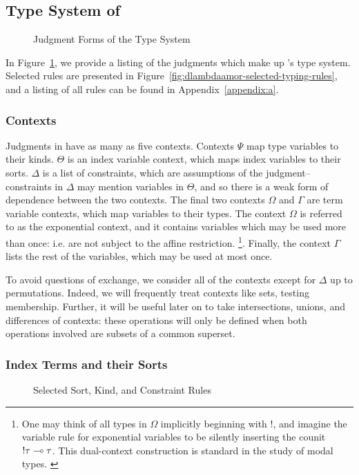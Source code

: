 \subsection{Type System of \dlambdaamor}
\begin{figure}

\label{fig:dlambdaamor-typing-judgments}
\caption{Judgment Forms of the \dlambdaamor Type System}
\end{figure}

In Figure~\ref{fig:dlambdaamor-typing-judgments}, we provide a listing of the judgments which make up \dlambdaamor's type system. Selected rules are presented in Figure~\ref{fig:dlambdaamor-selected-typing-rules}, and a listing of all rules can be found in Appendix~\ref{appendix:a}.

\subsubsection{Contexts}
Judgments in \dlambdaamor have as many as five contexts.
 Contexts $\Psi$ map type variables to their kinds. $\Theta$ is an index variable context, which maps index variables to their sorts. $\Delta$ is a list of constraints, which are assumptions of the judgment-- constraints in $\Delta$ may mention variables in $\Theta$, and so there is a weak form of dependence between the two contexts. The final two contexts $\Omega$ and $\Gamma$ are term variable contexts, which map variables to their types. The context $\Omega$ is referred to as the exponential context, and it contains variables which may be used more than once: i.e. are not subject to the affine restriction.
\footnote{
One may think of all types in $\Omega$ implicitly beginning with $!$, and imagine the variable rule for exponential variables to be silently inserting the counit $!\tau \multimap \tau$. This dual-context construction is standard in the study of modal types. \cite{kavvos:lmcs}
}. Finally, the context $\Gamma$ lists the rest of the variables, which may be used at most once.

To avoid questions of exchange, we consider all of the contexts except for $\Delta$ up to permutations. Indeed, we will frequently treat contexts like sets, testing membership. Further, it will be useful later on to take intersections, unions, and differences of contexts: these operations will only be defined when both operations involved are subsets of a common superset.

\subsubsection{Index Terms and their Sorts}
\begin{figure}

\label{fig:dlambdaamor-selected-sort-kind-constr-rules}
\caption{Selected Sort, Kind, and Constraint Rules}
\end{figure}

